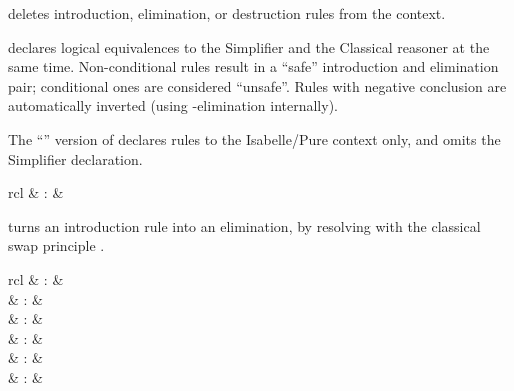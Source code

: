 \begin{isabellebody}
\begin{isamarkuptext}
\begin{descr}
  \item [\mbox{\isa{rule}}~\isa{del}] deletes introduction,
  elimination, or destruction rules from the context.

  \item [\mbox{\isa{iff}}] declares logical equivalences to the
  Simplifier and the Classical reasoner at the same time.
  Non-conditional rules result in a ``safe'' introduction and
  elimination pair; conditional ones are considered ``unsafe''.  Rules
  with negative conclusion are automatically inverted (using \isa{{\isasymnot}}-elimination internally).

  The ``\isa{{\isacharquery}}'' version of \mbox{} declares rules to
  the Isabelle/Pure context only, and omits the Simplifier
  declaration.

  \end{descr}%
\end{isamarkuptext}%
\isamarkuptrue%
%
\isamarkuptrue%
%
\begin{isamarkuptext}%
\begin{matharray}{rcl}
    \mbox{} & : & \isaratt \\
  \end{matharray}

  \begin{descr}

  \item [\mbox{\isa{swapped}}] turns an introduction rule into an
  elimination, by resolving with the classical swap principle .

  \end{descr}%
\end{isamarkuptext}%
\isamarkuptrue%
%
\isamarkuptrue%
%
\isamarkuptrue%
%
\begin{isamarkuptext}%
\begin{matharray}{rcl}
    \mbox{} & : &  \\
    \mbox{}\isa{\isactrlsup {\isacharasterisk}} & : &  \\
    \mbox{} & : & \isaratt \\
    \mbox{} & : & \isaratt \\
    \mbox{} & : & \isaratt \\
    \mbox{} & : & \isaratt \\
  \end{matharray}


\end{isamarkuptext}
\end{isabellebody}

